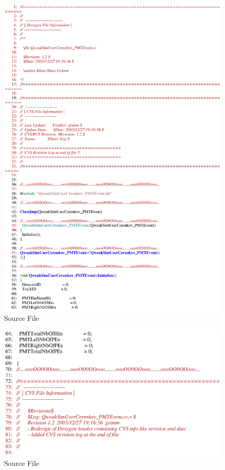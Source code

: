 \clearpage


\begin{figure}[ht]
  \hspace{0cm}
  \includegraphics[scale=0.8]{./figures5/QweakSimUserCerenkov_PMTEvent.cc-p1.eps}
  \caption{\label{SourceV43} Source File}
           \label{fig:V-SC-46}
\end{figure}

\clearpage

\begin{figure}[ht]
  \hspace{0cm}
  \includegraphics[scale=0.8]{./figures5/QweakSimUserCerenkov_PMTEvent.cc-p2.eps}
  \caption{\label{SourceV44} Source File}
           \label{fig:V-SC-47}
\end{figure}
